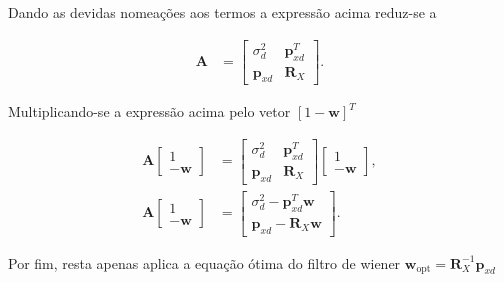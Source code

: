 \documentclass[a4paper,10pt]{article}
\begin{document}
\begin{enumerate}
				Dando as devidas nomeações aos termos a expressão acima reduz-se a
				
				\begin{align}
					\mathbf{A} &=  \left[ \begin{matrix} \sigma^{2}_{d} & \mathbf{p}_{xd}^{T} \\
						\mathbf{p}_{xd} & \mathbf{R}_{X} \end{matrix} \right].
				\end{align}
				
				Multiplicando-se a expressão acima pelo vetor $[1 - \mathbf{w}]^{T}$
				
				\begin{align}
					\mathbf{A} \left[ \begin{matrix} 1 \\ -\mathbf{w} \end{matrix} \right] &=   \left[ \begin{matrix} \sigma^{2}_{d} & \mathbf{p}_{xd}^{T} \\
						\mathbf{p}_{xd} & \mathbf{R}_{X} \end{matrix} \right] \left[ \begin{matrix} 1 \\ -\mathbf{w} \end{matrix} \right], \\
					\mathbf{A} \left[ \begin{matrix} 1 \\ -\mathbf{w} \end{matrix} \right] &=   \left[ \begin{matrix} \sigma^{2}_{d} - \mathbf{p}_{xd}^{T}\mathbf{w} \\
						\mathbf{p}_{xd} - \mathbf{R}_{X}\mathbf{w} \end{matrix} \right].
				\end{align}
				
				Por fim, resta apenas aplica a equação ótima do filtro de wiener $\mathbf{w}_{\text{opt}} = \mathbf{R}^{-1}_{X} \mathbf{p}_{xd}$
				

\end{enumerate}
\end{document}
